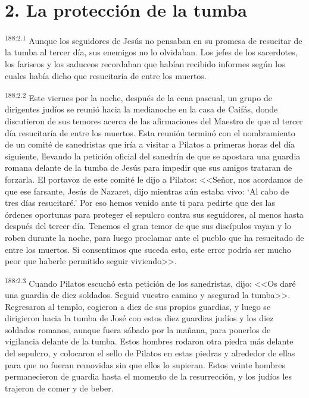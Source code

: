 \section*{2. La protección de la tumba}
\par 
\textsuperscript{188:2.1} Aunque los seguidores de Jesús no pensaban en su promesa de resucitar de la tumba al tercer día, sus enemigos no lo olvidaban. Los jefes de los sacerdotes, los fariseos y los saduceos recordaban que habían recibido informes según los cuales había dicho que resucitaría de entre los muertos.

\par 
\textsuperscript{188:2.2} Este viernes por la noche, después de la cena pascual, un grupo de dirigentes judíos se reunió hacia la medianoche en la casa de Caifás, donde discutieron de sus temores acerca de las afirmaciones del Maestro de que al tercer día resucitaría de entre los muertos. Esta reunión terminó con el nombramiento de un comité de sanedristas que iría a visitar a Pilatos a primeras horas del día siguiente, llevando la petición oficial del sanedrín de que se apostara una guardia romana delante de la tumba de Jesús para impedir que sus amigos trataran de forzarla. El portavoz de este comité le dijo a Pilatos: <<Señor, nos acordamos de que ese farsante, Jesús de Nazaret, dijo mientras aún estaba vivo: `Al cabo de tres días resucitaré.' Por eso hemos venido ante ti para pedirte que des las órdenes oportunas para proteger el sepulcro contra sus seguidores, al menos hasta después del tercer día. Tenemos el gran temor de que sus discípulos vayan y lo roben durante la noche, para luego proclamar ante el pueblo que ha resucitado de entre los muertos. Si consentimos que suceda esto, este error podría ser mucho peor que haberle permitido seguir viviendo>>.

\par 
\textsuperscript{188:2.3} Cuando Pilatos escuchó esta petición de los sanedristas, dijo: <<Os daré una guardia de diez soldados. Seguid vuestro camino y asegurad la tumba>>. Regresaron al templo, cogieron a diez de sus propios guardias, y luego se dirigieron hacia la tumba de José con estos diez guardias judíos y los diez soldados romanos, aunque fuera sábado por la mañana, para ponerlos de vigilancia delante de la tumba. Estos hombres rodaron otra piedra más delante del sepulcro, y colocaron el sello de Pilatos en estas piedras y alrededor de ellas para que no fueran removidas sin que ellos lo supieran. Estos veinte hombres permanecieron de guardia hasta el momento de la resurrección, y los judíos les trajeron de comer y de beber.

